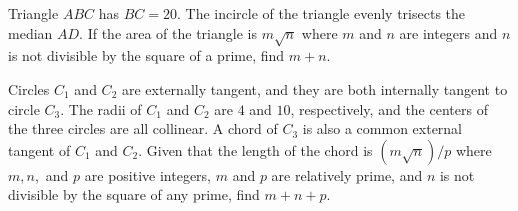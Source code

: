 %	













\begin{question}[name={2005 AIME I, \href{https://artofproblemsolving.com/community/c4p365372}{Problem 15}}]
	Triangle $ABC$ has $BC=20$. The incircle of the triangle evenly trisects the median $AD$. If the area of the triangle is $m \sqrt{n}$ where $m$ and $n$ are integers and $n$ is not divisible by the square of a prime, find $m+n$.	
\end{question}


%	













\begin{question}[name={2005 AIME II, \href{https://artofproblemsolving.com/community/c4p368269}{Problem 8}}]
	Circles $C_1$ and $C_2$ are externally tangent, and they are both internally tangent to circle $C_3$. The radii of $C_1$ and $C_2$ are $4$ and $10$, respectively, and the centers of the three circles are all collinear. A chord of $C_3$ is also a common external tangent of $C_1$ and $C_2$. Given that the length of the chord is $({m\sqrt{n}})/{p}$ where $m,n,$ and $p$ are positive integers, $m$ and $p$ are relatively prime, and $n$ is not divisible by the square of any prime, find $m+n+p$.
\end{question}


%	



















